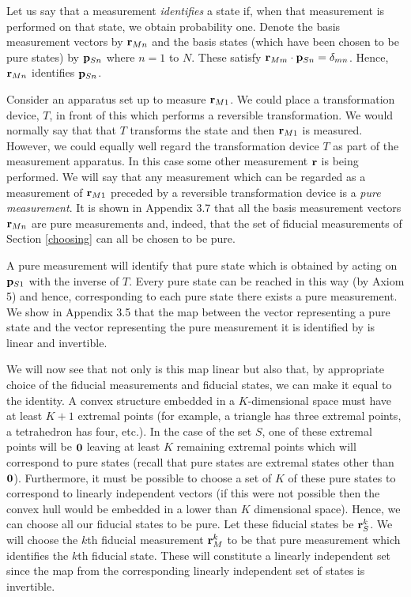 \documentclass[10pt,twocolumn]{article}
\begin{document}
Let us say that a measurement {\it identifies} a state if, when that
measurement is performed on that state, we obtain probability one.
Denote the basis measurement vectors by ${\bf r}_{Mn}$ and the basis
states (which have been chosen to be pure states)
by ${\bf p}_{Sn}$ where $n=1$ to $N$. These satisfy
${\bf r}_{Mm}\cdot{\bf p}_{Sn}=\delta_{mn}$. Hence,
${\bf r}_{Mn}$ identifies ${\bf p}_{Sn}$.

Consider an apparatus set up to measure ${\bf r}_{M1}$.  We could place
a transformation device,  $T$, in front of this which performs a reversible
transformation.  We would normally say that that $T$ transforms the
state and then ${\bf r}_{M1}$ is measured.  However, we could equally
well regard the transformation device $T$ as part of the measurement
apparatus.  In this case some other measurement ${\bf r}$ is being
performed.  We will say that any measurement which can be regarded as a
measurement of ${\bf r}_{M1}$ preceded by a reversible transformation
device is a {\it pure measurement}.  It is shown in Appendix 3.7 that all
the basis measurement vectors ${\bf r}_{Mn}$ are pure measurements and,
indeed, that the set of fiducial measurements of Section \ref{choosing}
can all be chosen to be pure.

A pure measurement will
identify that pure state which is obtained by acting on ${\bf p}_{S1}$
with the inverse of $T$. Every pure state can be reached in this
way (by Axiom 5) and hence, corresponding to each pure state there
exists a pure measurement.  We show in Appendix 3.5 that the map between
the vector representing a pure state and the vector representing
the pure measurement it is identified by  is linear and invertible.

We will now see that not only is this map linear but also that, by
appropriate choice of the fiducial measurements and fiducial states, we
can make it equal to the identity.
A convex structure embedded in a $K$-dimensional space must have at
least $K+1$ extremal points (for example, a triangle has three extremal
points, a tetrahedron has four, etc.). In the case of the set $S$, one
of these extremal points will be ${\bf 0}$ leaving at least $K$
remaining extremal points which will correspond to pure states (recall
that pure states are extremal states other than ${\bf 0}$).
Furthermore, it must be possible to choose a set of $K$ of these
pure states to correspond to linearly independent vectors (if this
were not possible then the convex hull would be embedded in a lower than
$K$ dimensional space).
Hence, we can choose all our fiducial states to be pure.
Let these fiducial states be ${\bf r}^k_S$. We will choose
the $k$th fiducial measurement ${\bf r}^k_M$ to be that pure measurement which
identifies the $k$th fiducial state. These will constitute a linearly
independent set since the map from the corresponding linearly
independent set of states is invertible.
\end{document}
